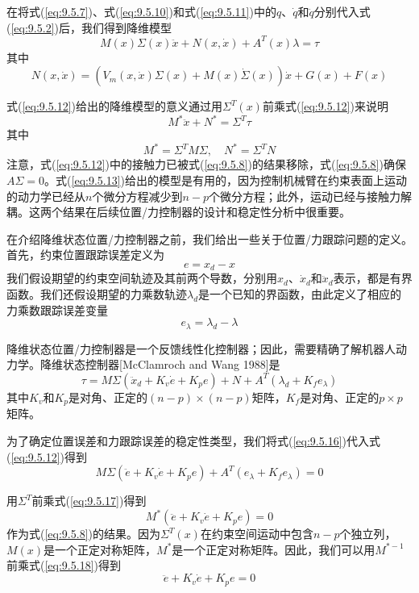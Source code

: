 \documentclass[12pt,a4paper]{ctexart}
\begin{document}
在将式(\ref{eq:9.5.7})、式(\ref{eq:9.5.10})和式(\ref{eq:9.5.11})中的$q$、$\dot{q}$和$\ddot{q}$分别代入式(\ref{eq:9.5.2})后，我们得到降维模型
\begin{equation}\label{eq:9.5.12}
M(x)\Sigma(x)\ddot{x} + N(x, \dot{x}) + A^T(x)\lambda = \tau
\end{equation}
其中
\[
N(x, \dot{x}) = (V_m(x, \dot{x})\Sigma(x) + M(x)\dot{\Sigma}(x))\dot{x} + G(x) + F(x)
\]

式(\ref{eq:9.5.12})给出的降维模型的意义通过用$\Sigma^T(x)$前乘式(\ref{eq:9.5.12})来说明
\begin{equation}\label{eq:9.5.13}
M^*\ddot{x} + N^* = \Sigma^T \tau
\end{equation}
其中
\[
M^* = \Sigma^T M \Sigma, \quad N^* = \Sigma^T N
\]
注意，式(\ref{eq:9.5.12})中的接触力已被式(\ref{eq:9.5.8})的结果移除，式(\ref{eq:9.5.8})确保$A\Sigma = 0$。式(\ref{eq:9.5.13})给出的模型是有用的，因为控制机械臂在约束表面上运动的动力学已经从$n$个微分方程减少到$n - p$个微分方程；此外，运动已经与接触力解耦。这两个结果在后续位置/力控制器的设计和稳定性分析中很重要。

在介绍降维状态位置/力控制器之前，我们给出一些关于位置/力跟踪问题的定义。首先，约束位置跟踪误差定义为
\begin{equation}\label{eq:9.5.14}
e = x_d - x
\end{equation}
我们假设期望的约束空间轨迹及其前两个导数，分别用$x_d$、$\dot{x}_d$和$\ddot{x}_d$表示，都是有界函数。我们还假设期望的力乘数轨迹$\lambda_d$是一个已知的界函数，由此定义了相应的力乘数跟踪误差变量
\begin{equation}\label{eq:9.5.15}
e_\lambda = \lambda_d - \lambda
\end{equation}

降维状态位置/力控制器是一个反馈线性化控制器；因此，需要精确了解机器人动力学。降维状态控制器[McClamroch and Wang 1988]是
\begin{equation}\label{eq:9.5.16}
\tau = M\Sigma(\ddot{x}_d + K_v\dot{e} + K_p e) + N + A^T(\lambda_d + K_f e_\lambda)
\end{equation}
其中$K_v$和$K_p$是对角、正定的$(n - p) \times (n - p)$矩阵，$K_f$是对角、正定的$p \times p$矩阵。

为了确定位置误差和力跟踪误差的稳定性类型，我们将式(\ref{eq:9.5.16})代入式(\ref{eq:9.5.12})得到
\begin{equation}\label{eq:9.5.17}
M\Sigma(\ddot{e} + K_v\dot{e} + K_p e) + A^T(e_\lambda + K_f e_\lambda) = 0
\end{equation}

用$\Sigma^T$前乘式(\ref{eq:9.5.17})得到
\begin{equation}\label{eq:9.5.18}
M^*(\ddot{e} + K_v\dot{e} + K_p e) = 0
\end{equation}
作为式(\ref{eq:9.5.8})的结果。因为$\Sigma^T(x)$在约束空间运动中包含$n - p$个独立列，$M(x)$是一个正定对称矩阵，$M^*$是一个正定对称矩阵。因此，我们可以用$M^{*-1}$前乘式(\ref{eq:9.5.18})得到
\begin{equation}\label{eq:9.5.19}
\ddot{e} + K_v\dot{e} + K_p e = 0
\end{equation}
\end{document}
